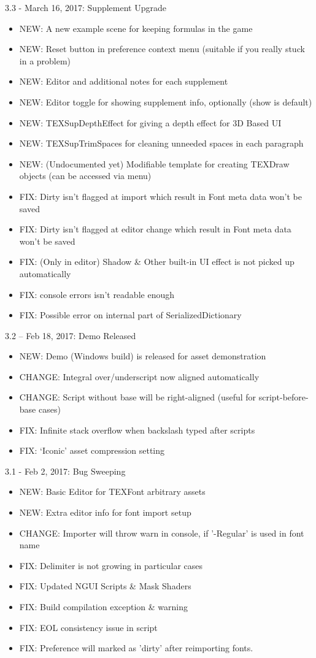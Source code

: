\documentclass[12pt]{article}
\begin{document}
3.3 - March 16, 2017: Supplement Upgrade
\begin{itemize}
\item NEW: A new example scene for keeping formulas in the game
\item NEW: Reset button in preference context menu (suitable if you really stuck in a problem)
\item NEW: Editor and additional notes for each supplement
\item NEW: Editor toggle for showing supplement info, optionally (show is default)
\item NEW: TEXSupDepthEffect for giving a depth effect for 3D Based UI
\item NEW: TEXSupTrimSpaces for cleaning unneeded spaces in each paragraph
\item NEW: (Undocumented yet) Modifiable template for creating TEXDraw objects (can be accessed via menu)
\item FIX: Dirty isn't flagged at import which result in Font meta data won't be saved
\item FIX: Dirty isn't flagged at editor change which result in Font meta data won't be saved
\item FIX: (Only in editor) Shadow \& Other built-in UI effect is not picked up automatically
\item FIX: console errors isn't readable enough
\item FIX: Possible error on internal part of SerializedDictionary
\end{itemize}

3.2 – Feb 18, 2017: Demo Released
\begin{itemize}
\item NEW: Demo (Windows build) is released for asset demonstration
\item CHANGE: Integral over/underscript now aligned automatically
\item CHANGE: Script without base will be right-aligned (useful for script-before-base cases)
\item FIX: Infinite stack overflow when backslash typed after scripts
\item FIX: ‘Iconic’ asset compression setting
\end{itemize}

3.1 - Feb 2, 2017: Bug Sweeping
\begin{itemize}
\item NEW: Basic Editor for TEXFont arbitrary assets
\item NEW: Extra editor info for font import setup
\item CHANGE: Importer will throw warn in console, if '-Regular' is used in font name
\item FIX: Delimiter is not growing in particular cases
\item FIX: Updated NGUI Scripts \& Mask Shaders
\item FIX: Build compilation exception \& warning
\item FIX: EOL consistency issue in script
\item FIX: Preference will marked as 'dirty' after reimporting fonts.
\end{itemize}
\end{document}
